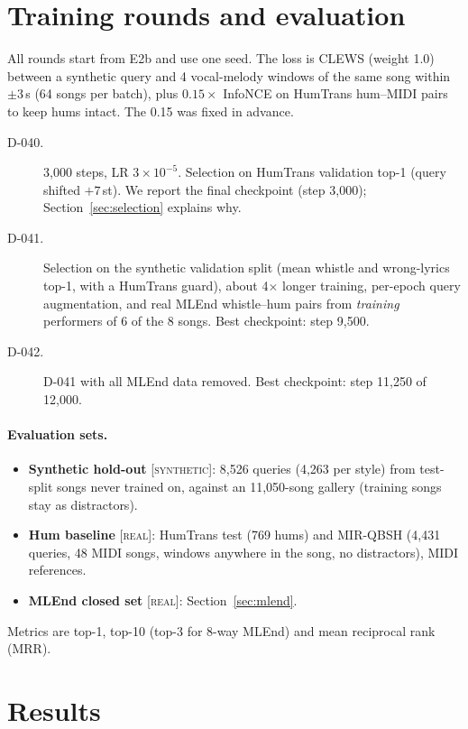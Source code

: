 \documentclass[11pt]{article}
\newcommand{\syn}{\textsc{[synthetic]}}
\newcommand{\real}{\textsc{[real]}}
\newcommand{\st}{\,st}
\begin{document}
\section{Training rounds and evaluation}\label{sec:setup}

All rounds start from E2b and use one seed. The loss is CLEWS (weight 1.0) between a synthetic query and 4 vocal-melody windows of the same song within $\pm3$\,s (64 songs per batch), plus $0.15\times$ InfoNCE on HumTrans hum--MIDI pairs to keep hums intact. The 0.15 was fixed in advance.

\begin{description}
\item[D-040.] 3,000 steps, LR $3\times10^{-5}$. Selection on HumTrans validation top-1 (query shifted $+7$\st). We report the final checkpoint (step 3,000); Section~\ref{sec:selection} explains why.
\item[D-041.] Selection on the synthetic validation split (mean whistle and wrong-lyrics top-1, with a HumTrans guard), about 4$\times$ longer training, per-epoch query augmentation, and real MLEnd whistle--hum pairs from \emph{training} performers of 6 of the 8 songs. Best checkpoint: step 9,500.
\item[D-042.] D-041 with all MLEnd data removed. Best checkpoint: step 11,250 of 12,000.
\end{description}

\paragraph{Evaluation sets.}
\begin{itemize}
\item \textbf{Synthetic hold-out} \syn: 8,526 queries (4,263 per style) from test-split songs never trained on, against an 11,050-song gallery (training songs stay as distractors).
\item \textbf{Hum baseline} \real: HumTrans test (769 hums) and MIR-QBSH (4,431 queries, 48 MIDI songs, windows anywhere in the song, no distractors), MIDI references.
\item \textbf{MLEnd closed set} \real: Section~\ref{sec:mlend}.
\end{itemize}
Metrics are top-1, top-10 (top-3 for 8-way MLEnd) and mean reciprocal rank (MRR).

\section{Results}\label{sec:results}
\end{document}

